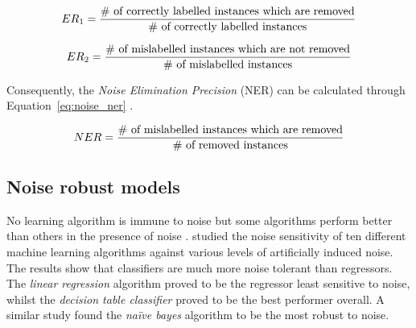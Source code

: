 \begin{equation}\label{eq:noise_type1}
	ER\textsubscript{1} = \frac{\textnormal{\# of correctly labelled instances which are removed}}{\textnormal{\# of correctly labelled instances}}
\end{equation}

\begin{equation}\label{eq:noise_type2}
	ER\textsubscript{2} = \frac{\textnormal{\# of mislabelled instances which are not removed}}{\textnormal{\# of mislabelled instances}}
\end{equation}

Consequently, the \textit{Noise Elimination Precision} (NER) can be calculated through Equation~\ref{eq:noise_ner} \citep{frenay2014classification}.

\begin{equation}\label{eq:noise_ner}
	NER = \frac{\textnormal{\# of mislabelled instances which are removed}}{\textnormal{\# of removed instances}}
\end{equation}

\subsection{Noise robust models}\label{sec:noise_robust_models}

No learning algorithm is immune to noise but some algorithms perform better than others in the presence of noise \citep{frenay2014comprehensive}.  \citet{kalapanidas2003machine} studied the noise sensitivity of ten different machine learning algorithms against various levels of artificially induced noise.  The results show that classifiers are much more noise tolerant than regressors.  The \textit{linear regression} algorithm proved to be the regressor least sensitive to noise, whilst the \textit{decision table classifier} proved to be the best performer overall.  A similar study \citep{nettleton2010study} found the \textit{naïve bayes} algorithm to be the most robust to noise.

